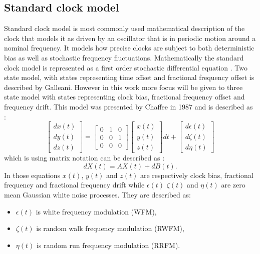 \subsection{Standard clock model}
Standard clock model is most commonly used mathematical description of the clock that models it as
driven by an oscillator that is in periodic motion around a nominal frequency.
It models how precise clocks are subject to both deterministic bias as well as stochastic 
frequency fluctuations.
Mathematically the standard clock model is represented as a first order stochastic differential
equation . Two state model, with states representing time offset and fractional frequency offset
is described by Galleani. However in this work more focus will be given to three state model 
with states representing clock bias, fractional frequency offset and frequency drift.
This model was presented by Chaffee in 1987 and is described as :
\begin{equation}
	\label{equ:three_state_clock}
	\left[ \begin{array}{c} dx(t)\\ dy(t)\\ dz(t) \end{array} \right] =
	\left[ \begin{array}{ccc} 0& 1& 0\\ 0& 0& 1\\ 0& 0& 0 \end{array} \right]
	\left[ \begin{array}{c} x(t)\\ y(t)\\ z(t) \end{array} \right] dt +
	\left[ \begin{array}{c} d\epsilon(t)\\ d\zeta(t)\\ d\eta(t) \end{array} \right] 
\end{equation}
which is using matrix notation can be described as :
\begin{equation}
	\label{equ:clock_matrix}
	dX(t) = AX(t) +dB(t).
\end{equation}
In those equations $x(t)$, $y(t)$ and $z(t)$ are respectively clock bias, fractional frequency and
fractional frequency drift while $\epsilon(t)$ $\zeta(t)$ and $\eta(t)$ are zero mean Gaussian
white noise processes. They are described as:
\begin{itemize}
	\item $\epsilon(t)$ is white frequency modulation (WFM),
	\item $\zeta(t)$ is random walk frequency modulation (RWFM),
	\item $\eta(t)$ is random run frequency modulation (RRFM).
\end{itemize}
